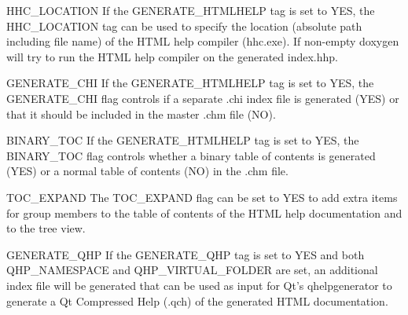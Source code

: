 \begin{DoxyDescription}
\label{config_cfg_hhc_location}
\hypertarget{config_cfg_hhc_location}{}
 
\item[{\ttfamily HHC\_\-LOCATION} ] If the {\ttfamily GENERATE\_\-HTMLHELP} tag is set to {\ttfamily YES}, the {\ttfamily HHC\_\-LOCATION} tag can be used to specify the location (absolute path including file name) of the HTML help compiler (hhc.exe). If non-\/empty doxygen will try to run the HTML help compiler on the generated index.hhp.

\label{config_cfg_generate_chi}
\hypertarget{config_cfg_generate_chi}{}
 
\item[{\ttfamily GENERATE\_\-CHI} ] If the {\ttfamily GENERATE\_\-HTMLHELP} tag is set to {\ttfamily YES}, the {\ttfamily GENERATE\_\-CHI} flag controls if a separate .chi index file is generated ({\ttfamily YES}) or that it should be included in the master .chm file ({\ttfamily NO}).

\label{config_cfg_binary_toc}
\hypertarget{config_cfg_binary_toc}{}
 
\item[{\ttfamily BINARY\_\-TOC} ] If the {\ttfamily GENERATE\_\-HTMLHELP} tag is set to {\ttfamily YES}, the {\ttfamily BINARY\_\-TOC} flag controls whether a binary table of contents is generated ({\ttfamily YES}) or a normal table of contents ({\ttfamily NO}) in the .chm file.

\label{config_cfg_toc_expand}
\hypertarget{config_cfg_toc_expand}{}
 
\item[{\ttfamily TOC\_\-EXPAND} ] The {\ttfamily TOC\_\-EXPAND} flag can be set to YES to add extra items for group members to the table of contents of the HTML help documentation and to the tree view.

\label{config_cfg_generate_qhp}
\hypertarget{config_cfg_generate_qhp}{}
 
\item[{\ttfamily GENERATE\_\-QHP} ] If the GENERATE\_\-QHP tag is set to YES and both QHP\_\-NAMESPACE and QHP\_\-VIRTUAL\_\-FOLDER are set, an additional index file will be generated that can be used as input for Qt's qhelpgenerator to generate a Qt Compressed Help (.qch) of the generated HTML documentation.

\label{config_cfg_qhp_namespace}
\hypertarget{config_cfg_qhp_namespace}{}
 

\end{DoxyDescription}
